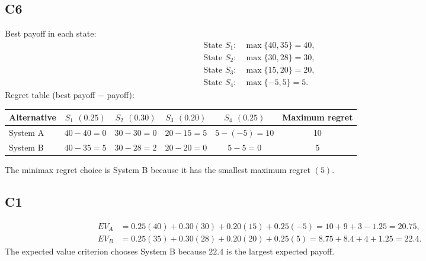 \begin{ExamProblems}
		\subsection*{C6}
		Best payoff in each state:
		\[
		\begin{aligned}
			\text{State } S_1: &\max\{40, 35\} = 40, \\
			\text{State } S_2: &\max\{30, 28\} = 30, \\
			\text{State } S_3: &\max\{15, 20\} = 20, \\
			\text{State } S_4: &\max\{-5, 5\} = 5.
		\end{aligned}
		\]
		Regret table (best payoff $-$ payoff):
		\begin{center}
			\begin{tabular}{l c c c c c}
				\toprule
				Alternative & $S_1$ $(0.25)$ & $S_2$ $(0.30)$ & $S_3$ $(0.20)$ & $S_4$ $(0.25)$ & Maximum regret \\
				\midrule
				System A & $40-40=0$ & $30-30=0$ & $20-15=5$ & $5-(-5)=10$ & 10 \\
				System B & $40-35=5$ & $30-28=2$ & $20-20=0$ & $5-5=0$ & 5 \\
				\bottomrule
			\end{tabular}
		\end{center}
		The minimax regret choice is System B because it has the smallest maximum regret $(5)$.
		
		\subsection*{C1}
		\[
		\begin{aligned}
		EV_A &= 0.25(40)+0.30(30)+0.20(15)+0.25(-5)=10+9+3-1.25=20.75,\\
		EV_B &= 0.25(35)+0.30(28)+0.20(20)+0.25(5)=8.75+8.4+4+1.25=22.4.
		\end{aligned}
		\]
		The expected value criterion chooses System B because $22.4$ is the largest expected payoff.
		
		\item

\end{ExamProblems}

